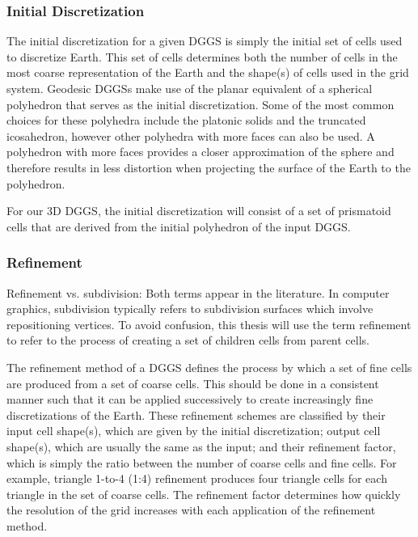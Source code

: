 \subsubsection{Initial Discretization} \label{sec:dggs:discretization}
The initial discretization for a given DGGS is simply the initial set of cells used to discretize Earth.
This set of cells determines both the number of cells in the most coarse representation of the Earth and the shape(s) of cells used in the grid system.
Geodesic DGGSs make use of the planar equivalent of a spherical polyhedron that serves as the initial discretization.
Some of the most common choices for these polyhedra include the platonic solids and the truncated icosahedron, however other polyhedra with more faces can also be used.
A polyhedron with more faces provides a closer approximation of the sphere and therefore results in less distortion when projecting the surface of the Earth to the polyhedron.


For our 3D DGGS, the initial discretization will consist of a set of prismatoid cells that are derived from the initial polyhedron of the input DGGS.


\subsubsection{Refinement} \label{sec:dggs:refinement}
Refinement vs. subdivision: Both terms appear in the literature.
In computer graphics, subdivision typically refers to subdivision surfaces which involve repositioning vertices.
To avoid confusion, this thesis will use the term refinement to refer to the process of creating a set of children cells from parent cells. 


The refinement method of a DGGS defines the process by which a set of fine cells are produced from a set of coarse cells.
This should be done in a consistent manner such that it can be applied successively to create increasingly fine discretizations of the Earth.
These refinement schemes are classified by their input cell shape(s), which are given by the initial discretization; output cell shape(s), which are usually the same as the input; and their refinement factor, which is simply the ratio between the number of coarse cells and fine cells.
For example, triangle 1-to-4 (1:4) refinement produces four triangle cells for each triangle in the set of coarse cells.
The refinement factor determines how quickly the resolution of the grid increases with each application of the refinement method.


